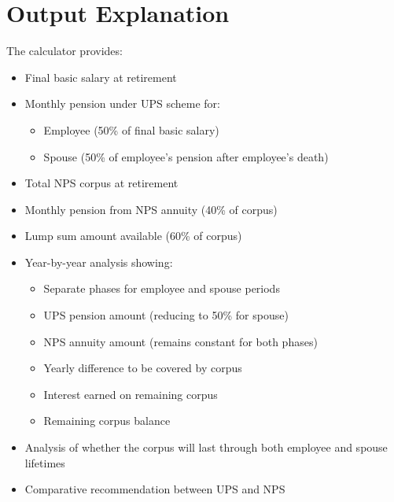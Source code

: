 \documentclass{article}
\begin{document}
\section{Output Explanation}
The calculator provides:
\begin{itemize}
    \item Final basic salary at retirement
    \item Monthly pension under UPS scheme for:
    \begin{itemize}
        \item Employee (50\% of final basic salary)
        \item Spouse (50\% of employee's pension after employee's death)
    \end{itemize}
    \item Total NPS corpus at retirement
    \item Monthly pension from NPS annuity (40\% of corpus)
    \item Lump sum amount available (60\% of corpus)
    \item Year-by-year analysis showing:
    \begin{itemize}
        \item Separate phases for employee and spouse periods
        \item UPS pension amount (reducing to 50\% for spouse)
        \item NPS annuity amount (remains constant for both phases)
        \item Yearly difference to be covered by corpus
        \item Interest earned on remaining corpus
        \item Remaining corpus balance
    \end{itemize}
    \item Analysis of whether the corpus will last through both employee and spouse lifetimes
    \item Comparative recommendation between UPS and NPS
\end{itemize}
\end{document}
